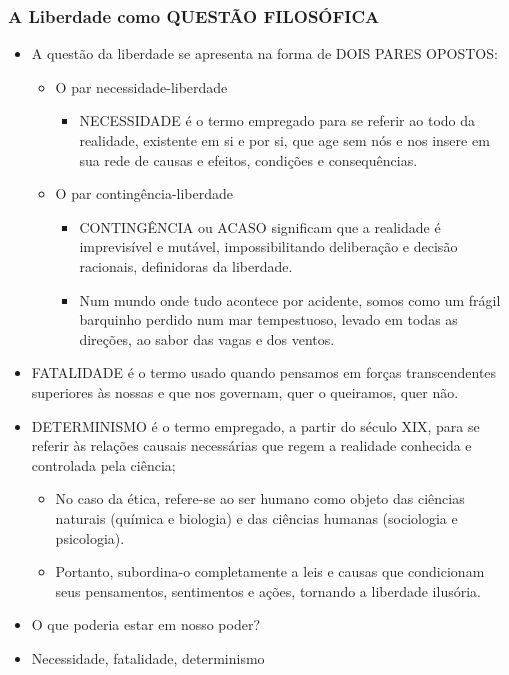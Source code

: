 \documentclass[
]{book}
\providecommand{\tightlist}{%
  \setlength{\itemsep}{0pt}\setlength{\parskip}{0pt}}
\begin{document}
\hypertarget{a-liberdade-como-questuxe3o-filosuxf3fica}{%
\subsubsection{A Liberdade como QUESTÃO
FILOSÓFICA}\label{a-liberdade-como-questuxe3o-filosuxf3fica}}

\begin{itemize}
\tightlist
\item
  A questão da liberdade se apresenta na forma de DOIS PARES OPOSTOS:

  \begin{itemize}
  \tightlist
  \item
    O par necessidade-liberdade

    \begin{itemize}
    \tightlist
    \item
      NECESSIDADE é o termo empregado para se referir ao todo da
      realidade, existente em si e por si, que age sem nós e nos insere
      em sua rede de causas e efeitos, condições e consequências.
    \end{itemize}
  \item
    O par contingência-liberdade

    \begin{itemize}
    \tightlist
    \item
      CONTINGÊNCIA ou ACASO significam que a realidade é imprevisível e
      mutável, impossibilitando deliberação e decisão racionais,
      definidoras da liberdade.
    \item
      Num mundo onde tudo acontece por acidente, somos como um frágil
      barquinho perdido num mar tempestuoso, levado em todas as
      direções, ao sabor das vagas e dos ventos.
    \end{itemize}
  \end{itemize}
\item
  FATALIDADE é o termo usado quando pensamos em forças transcendentes
  superiores às nossas e que nos governam, quer o queiramos, quer não.
\item
  DETERMINISMO é o termo empregado, a partir do século XIX, para se
  referir às relações causais necessárias que regem a realidade
  conhecida e controlada pela ciência;

  \begin{itemize}
  \tightlist
  \item
    No caso da ética, refere-se ao ser humano como objeto das ciências
    naturais (química e biologia) e das ciências humanas (sociologia e
    psicologia).
  \item
    Portanto, subordina-o completamente a leis e causas que condicionam
    seus pensamentos, sentimentos e ações, tornando a liberdade
    ilusória.
  \end{itemize}
\item
  O que poderia estar em nosso poder?
\item
  Necessidade, fatalidade, determinismo


\end{itemize}
\end{document}
